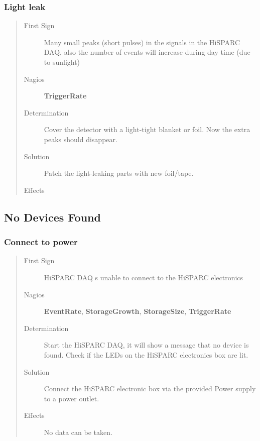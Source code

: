 \documentclass[a4paper,11pt,english]{sphinxmanual}
\begin{document}
\subsubsection{Light leak}
\label{known-issues:light-leak}\begin{quote}\begin{description}
\item[{First Sign}] \leavevmode
Many small peaks (short pulses) in the signals in the HiSPARC DAQ, also the number of events will increase during day time (due to sunlight)

\item[{Nagios}] \leavevmode
\textbf{TriggerRate}

\item[{Determination}] \leavevmode
Cover the detector with a light-tight blanket or foil. Now the extra peaks should disappear.

\item[{Solution}] \leavevmode
Patch the light-leaking parts with new foil/tape.

\item[{Effects}] \leavevmode
\end{description}\end{quote}


\subsection{No Devices Found}
\label{known-issues:no-devices-found}

\subsubsection{Connect to power}
\label{known-issues:connect-to-power}\begin{quote}\begin{description}
\item[{First Sign}] \leavevmode
HiSPARC DAQ s unable to connect to the HiSPARC electronics

\item[{Nagios}] \leavevmode
\textbf{EventRate}, \textbf{StorageGrowth}, \textbf{StorageSize}, \textbf{TriggerRate}

\item[{Determination}] \leavevmode
Start the HiSPARC DAQ, it will show a message that no device is found. Check if the LEDs on the HiSPARC electronics box are lit.

\item[{Solution}] \leavevmode
Connect the HiSPARC electronic box via the provided Power supply to a power outlet.

\item[{Effects}] \leavevmode
No data can be taken.

\end{description}\end{quote}



\renewcommand{\indexname}{Index}
\printindex
\end{document}

